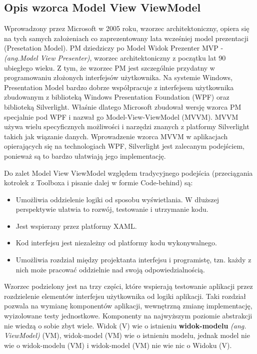 \documentclass[a4paper,twoside,titlepage,openright]{book}
\begin{document}
\subsection{Opis wzorca Model View ViewModel}

Wprowadzony przez Microsoft w 2005 roku, wzorzec architektoniczny, opiera się na tych samych założeniach co zaprezentowany lata wcześniej model prezentacji (Presetation Model). PM dziedziczy po Model Widok Prezenter MVP - \textit{(ang.Model View Presenter)}, wzorzec architektoniczny z początku lat 90 ubiegłego wieku. Z tym, że wzorzec PM jest szczególnie przydatny w programowaniu złożonych interfejsów użytkownika. Na systemie Windows, Presentation Model bardzo dobrze współpracuje z interfejsem użytkownika zbudowanym z biblioteką Windows Presentation Foundation (WPF) oraz biblioteką Silverlight. Właśnie dlatego Microsoft zbudował wersję wzorca PM specjalnie pod WPF i nazwał go Model-View-ViewModel (MVVM). \cite{aspNet} MVVM używa wielu specyficznych możliwości i narzędzi znanych z platformy Silverlight takich jak wiązanie danych. Wprowadzenie wzorca MVVM w aplikacjach opierających się na technologiach WPF, Silverlight jest zalecanym podejściem, ponieważ są to bardzo ułatwiają jego implementację.

Do zalet Model View ViewModel względem tradycyjnego podejścia (przeciągania kotrolek z Toolboxa i pisanie dalej w formie Code-behind) są:

\begin{itemize}

	\item Umożliwia oddzielenie logiki od sposobu wyświetlania. W dłuższej perspektywie ułatwia to rozwój, testowanie i utrzymanie kodu.
	\item Jest wspierany przez platformy XAML.
	\item Kod interfejsu jest niezależny od platformy kodu wykonywalnego.
	\item Umożliwia rozdział między projektanta interfejsu i programistę, tzn. każdy z nich może pracować oddzielnie nad swoją odpowiedzialnością.
\end{itemize}

Wzorzec podzielony jest na trzy części, które wspierają testowanie aplikacji przez rozdzielenie elementów interfejsu użytkownika od logiki aplikacji. Taki rozdział pozwala na wymianę komponentów aplikacji, wewnętrzną zmianę implementację, wyizolowane testy jednostkowe. Komponenty na najwyższym poziomie abstrakcji nie wiedzą o sobie zbyt wiele. Widok (V) wie o istnieniu \textbf{widok-modelu} \textit{(ang. ViewModel)} (VM), widok-model (VM) wie o istnieniu modelu, jednak model nie wie o widok-modelu (VM) i widok-model (VM) nie wie nic o Widoku (V).
\end{document}
